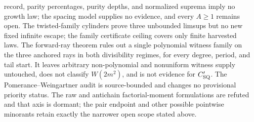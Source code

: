 \documentclass[10pt,reqno]{amsart}
\theoremstyle{definition}
\newcommand{\1}{\mathbf 1}
\begin{document}
record, parity percentages,
purity depths, and normalized suprema imply no growth law; the spacing model
supplies no evidence, and every $A\geq1$ remains open.  The twisted-family
cylinders prove three unbounded limsups but no new fixed infinite escape;
the family certificate ceiling covers only finite harvested laws.  The
forward-ray theorem rules out a single polynomial witness family on the
three anchored rays in both divisibility regimes, for every degree, period,
and tail start.  It leaves arbitrary non-polynomial and nonuniform witness
supply untouched, does not classify $W(2m^2)$, and is not evidence for
$C_{\rm SQ}'$.  The Pomerance--Weingartner audit is
source-bounded and changes no provisional priority status.  The raw and
antichain factorial-moment formulations are refuted
and that axis is dormant; the pair
endpoint and other possible pointwise minorants retain exactly the narrower
open scope stated above.
\end{document}
